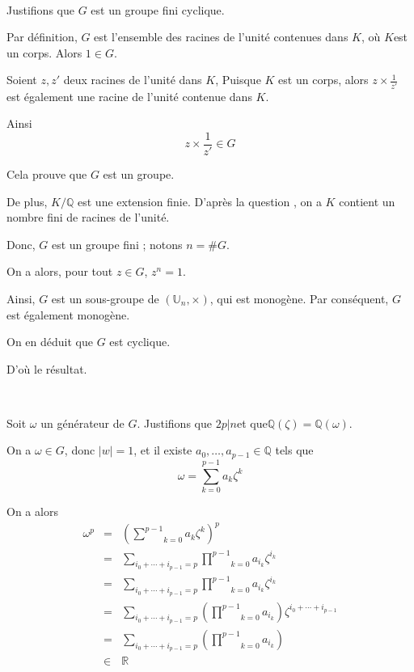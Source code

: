 \

 Justifions que $G$ est un groupe fini cyclique.

Par d{\'e}finition, $G$ est l'ensemble des racines de l'unit{\'e} contenues
dans $K$, o{\`u} $K$est un corps. Alors $1 \in G$.

Soient $z, z'$ deux racines de l'unit{\'e} dans $K$, Puisque $K$ est un
corps, alors $z \times \frac{1}{z'}$ est {\'e}galement une racine de
l'unit{\'e} contenue dans $K$.

Ainsi
\[ z \times \frac{1}{z'} \in G \]


Cela prouve que $G$ est un groupe.

De plus, $K /\mathbb{Q}$ est une extension finie. D'apr{\`e}s la question
, on a $K$ contient un nombre fini de racines de
l'unit{\'e}.

Donc, $G$ est un groupe fini ; notons $n =\#G$.

On a alors, pour tout $z \in G$, $z^n = 1$.

Ainsi, $G$ est un sous-groupe de $(\mathbb{U}_n, \times)$, qui est
monog{\`e}ne. Par cons{\'e}quent, $G$ est {\'e}galement monog{\`e}ne.

On en d{\'e}duit que $G$ est cyclique.

D'o{\`u} le r{\'e}sultat.

\

 Soit $\omega$ un g{\'e}n{\'e}rateur de $G$. Justifions que $2
p | n$et que$\mathbb{Q}(\zeta) =\mathbb{Q}(\omega)$.

On a $\omega \in G$, donc $| w | = 1$, et il existe $a_0, \ldots, a_{p - 1}
\in \mathbb{Q}$ tels que
\[ \omega = \underset{k = 0}{\overset{p - 1}{\sum}} a_k \zeta^k \]


On a alors
\begin{eqnarray*}
  \omega^p & = & \left( \underset{k = 0}{\overset{p - 1}{\sum}} a_k \zeta^k
  \right)^p\\
  & = & \underset{i_0 + \cdots + i_{p - 1} = p}{\sum}  \underset{k =
  0}{\overset{p - 1}{\prod}} a_{i_k} \zeta^{i_k}\\
  & = & \underset{i_0 + \cdots + i_{p - 1} = p}{\sum}  \underset{k =
  0}{\overset{p - 1}{\prod}} a_{i_k} \zeta^{i_k}\\
  & = & \underset{i_0 + \cdots + i_{p - 1} = p}{\sum}  \left( \underset{k =
  0}{\overset{p - 1}{\prod}} a_{i_k} \right) {\zeta^{i_0 + \cdots + i_{p -
  1}}} \\
  & = & \underset{i_0 + \cdots + i_{p - 1} = p}{\sum}  \left( \underset{k =
  0}{\overset{p - 1}{\prod}} a_{i_k} \right)\\
  & \in & \mathbb{R}
\end{eqnarray*}


